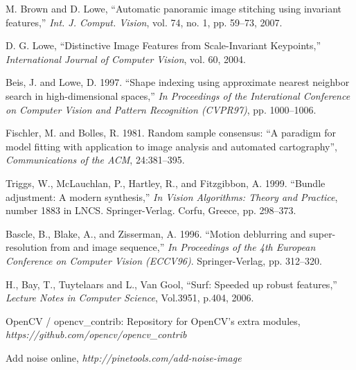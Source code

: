 \documentclass[10pt,twocolumn,letterpaper]{article}
\begin{document}
\begin{thebibliography}{9}
M. Brown and D. Lowe, ``Automatic panoramic image stitching using invariant features,''
\textit{Int. J. Comput. Vision}, vol. 74, no. 1, pp. 59–73, 2007.

D. G. Lowe, ``Distinctive Image Features from Scale-Invariant Keypoints,''
\textit{International Journal of Computer Vision}, vol. 60, 2004.

Beis, J. and Lowe, D. 1997. ``Shape indexing using approximate nearest neighbor search in high-dimensional spaces,''
\textit{In Proceedings of the Interational Conference on Computer Vision and Pattern Recognition (CVPR97)}, pp. 1000–1006.

Fischler, M. and Bolles, R. 1981. Random sample consensus: ``A paradigm for model fitting with application to image analysis and automated cartography'',
\textit{Communications of the ACM}, 24:381–395.

Triggs, W., McLauchlan, P., Hartley, R., and Fitzgibbon, A. 1999. ``Bundle adjustment: A modern synthesis,''
\textit{In Vision Algorithms: Theory and Practice}, number 1883 in LNCS. Springer-Verlag. Corfu, Greece, pp. 298–373.

Bascle, B., Blake, A., and Zisserman, A. 1996. ``Motion deblurring and super-resolution from and image sequence,''
\textit{In Proceedings of the 4th European Conference on Computer Vision (ECCV96)}. Springer-Verlag, pp. 312–320.

H., Bay, T., Tuytelaars and L., Van Gool, ``Surf: Speeded up robust features,''
\textit{Lecture Notes in Computer Science}, Vol.3951, p.404, 2006.

OpenCV / opencv\_contrib: Repository for OpenCV's extra modules,
\textit{https://github.com/opencv/opencv\_contrib}

Add noise online,
\textit{http://pinetools.com/add-noise-image}

\end{thebibliography}
\end{document}
